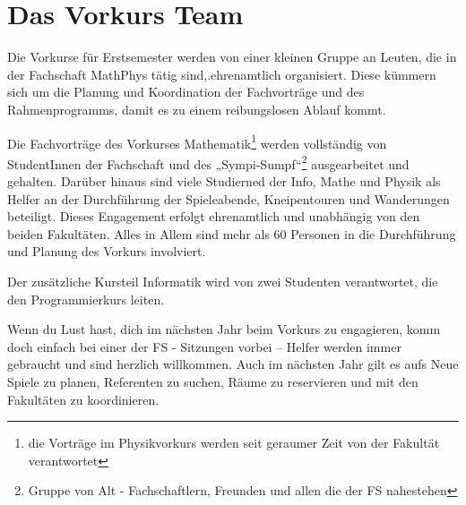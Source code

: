 \section{Das Vorkurs Team}Die Vorkurse für Erstsemester werden von einer
kleinen Gruppe an Leuten, die in der Fachschaft MathPhys tätig
sind,.ehrenamtlich organisiert.  Diese kümmern sich um die Planung und
Koordination der Fachvorträge und des Rahmenprogramms, damit es zu einem
reibungslosen Ablauf kommt.

Die Fachvorträge des Vorkurses Mathematik\footnote{die Vorträge im
Physikvorkurs werden seit geraumer Zeit von der Fakultät  verantwortet} werden
vollständig von StudentInnen der Fachschaft und des „Sympi-Sumpf“\footnote{Gruppe von Alt - Fachschaftlern, Freunden und allen die der FS
nahestehen} ausgearbeitet und gehalten. Darüber hinaus sind viele Studierned
der Info, Mathe und Physik als Helfer an der Durchführung der Spieleabende,
Kneipentouren und Wanderungen beteiligt. Dieses Engagement erfolgt ehrenamtlich
und unabhängig von den beiden Fakultäten. Alles in Allem sind mehr als 60
Personen in die Durchführung und Planung des Vorkurs involviert.

Der zusätzliche Kursteil Informatik wird von zwei Studenten verantwortet, die
den Programmierkurs leiten.

Wenn du Lust hast, dich im nächsten Jahr beim Vorkurs zu engagieren, komm doch
einfach bei einer der FS - Sitzungen vorbei -- Helfer werden immer gebraucht
und sind herzlich willkommen. Auch im nächsten Jahr gilt es aufs Neue Spiele zu
planen, Referenten zu suchen, Räume zu reservieren und mit den Fakultäten zu
koordinieren.
